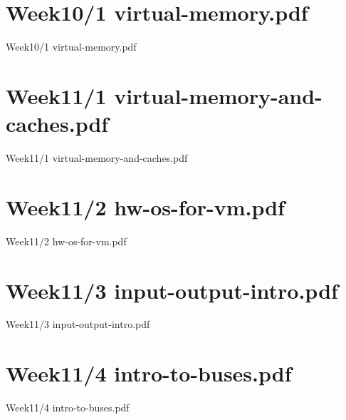 \documentclass[aspectratio = 169]{beamer}
\begin{document}
\section{Week10/1 virtual-memory.pdf}
\begin{frame}{Week10/1 virtual-memory.pdf}
\end{frame}

\section{Week11/1 virtual-memory-and-caches.pdf}
\begin{frame}{Week11/1 virtual-memory-and-caches.pdf}
\end{frame}

\section{Week11/2 hw-os-for-vm.pdf}
\begin{frame}{Week11/2 hw-os-for-vm.pdf}
\end{frame}

\section{Week11/3 input-output-intro.pdf}
\begin{frame}{Week11/3 input-output-intro.pdf}
\end{frame}

\section{Week11/4 intro-to-buses.pdf}
\begin{frame}{Week11/4 intro-to-buses.pdf}
\end{frame}

\newpage
\end{document}
